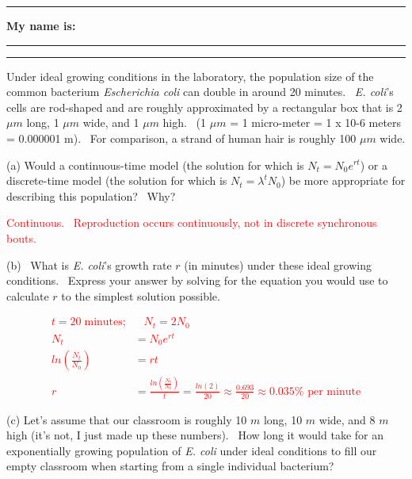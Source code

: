 \documentclass{article}
\newcommand*{\blanks}[1][4em]{\rule{#1}{.4pt}}
\begin{document}
\noindent{}

\rule[0.5ex]{\linewidth}{1pt}
\begin{center}
	\textbf{My name is:} \blanks[150pt]
\end{center}
\rule[0.5ex]{\linewidth}{1pt}

Under ideal growing conditions in the laboratory, the population size of the common bacterium \emph{Escherichia coli} can double in around 20 minutes.  \emph{E. coli}'s cells are rod-shaped and are roughly approximated by a rectangular box that is 2 $\mu m$ long, 1 $\mu m$ wide, and 1 $\mu m$ high.  (1 $\mu m$ = 1 micro-meter = 1 x 10-6 meters = 0.000001 m).  For comparison, a strand of human hair is roughly 100 $\mu m$ wide.

\vspace{1cm}

(a) Would a continuous-time model (the solution for which is $N_t=N_0 e^{rt}$) or a discrete-time model (the solution for which is $N_t = \lambda^t N_0$) be more appropriate for describing this population?  Why?

\vspace{1cm}

\textcolor{red}{Continuous.  Reproduction occurs continuously, not in discrete synchronous bouts.}

\vspace{1cm}

(b)  What is \emph{E. coli}'s growth rate $r$ (in minutes) under these ideal growing conditions.  Express your answer by solving for the equation you would use to calculate $r$ to the simplest solution possible.

\vspace{0.5cm}
\textcolor{red}{
\begin{align*}
	t=20 \; \text{minutes;} &\;\;\; N_t= 2 N_0\\
	N_t&=N_0 e^{rt}\\
	ln\left(\frac{N_t}{N_0}\right)&=rt\\
	r&=\frac{ln\left(\frac{N_t}{N_0}\right)}{t}=\frac{ln(2)}{20} \approx \frac{0.693}{20} \approx 0.035 \% \text{ per minute}
\end{align*}
}

\vspace{0.5cm}
(c) Let's assume that our classroom is roughly 10 $m$ long, 10 $m$ wide, and 8 $m$ high (it’s not, I just made up these numbers).  How long it would take for an exponentially growing population of \emph{E. coli} under ideal conditions to fill our empty classroom when starting from a single individual bacterium?
\end{document}
